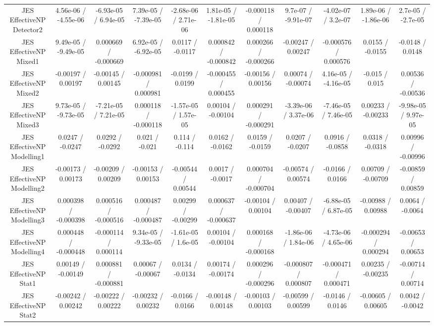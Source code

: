 \begin{table}[htbp]
\begin{center}
\begin{tabular}{|c|c|c|c|c|c|c|c|c|c|c|}
  JES EffectiveNP Detector2 & 4.56e-06 / -4.55e-06 & -6.93e-05 / 6.94e-05 & 7.39e-05 / -7.39e-05 & -2.68e-06 / 2.71e-06 & 1.81e-05 / -1.81e-05 & -0.000118 / 0.000118 & 9.7e-07 / -9.91e-07 & -4.02e-07 / 3.2e-07 & 1.89e-06 / -1.86e-06 & 2.7e-05 / -2.7e-05 \\ 
  JES EffectiveNP Mixed1 & 9.49e-05 / -9.49e-05 & 0.000669 / -0.000669 & 6.92e-05 / -6.92e-05 & 0.0117 / -0.0117 & 0.000842 / -0.000842 & 0.000266 / -0.000266 & -0.00247 / 0.00247 & -0.000576 / 0.000576 & 0.0155 / -0.0155 & -0.0148 / 0.0148 \\ 
  JES EffectiveNP Mixed2 & -0.00197 / 0.00197 & -0.00145 / 0.00145 & -0.000981 / 0.000981 & -0.0199 / 0.0199 & -0.000455 / 0.000455 & -0.00156 / 0.00156 & 0.00074 / -0.00074 & 4.16e-05 / -4.16e-05 & -0.015 / 0.015 & 0.00536 / -0.00536 \\ 
  JES EffectiveNP Mixed3 & 9.73e-05 / -9.73e-05 & -7.21e-05 / 7.21e-05 & 0.000118 / -0.000118 & -1.57e-05 / 1.57e-05 & 0.00104 / -0.00104 & 0.000291 / -0.000291 & -3.39e-06 / 3.37e-06 & -7.46e-05 / 7.46e-05 & 0.00233 / -0.00233 & -9.98e-05 / 9.97e-05 \\ 
  JES EffectiveNP Modelling1 & 0.0247 / -0.0247 & 0.0292 / -0.0292 & 0.021 / -0.021 & 0.114 / -0.114 & 0.0162 / -0.0162 & 0.0159 / -0.0159 & 0.0207 / -0.0207 & 0.0916 / -0.0858 & 0.0318 / -0.0318 & 0.00996 / -0.00996 \\ 
  JES EffectiveNP Modelling2 & -0.00173 / 0.00173 & -0.00209 / 0.00209 & -0.00153 / 0.00153 & -0.00544 / 0.00544 & 0.0017 / -0.0017 & 0.000704 / -0.000704 & -0.00574 / 0.00574 & -0.0166 / 0.0166 & 0.00709 / -0.00709 & -0.00859 / 0.00859 \\ 
  JES EffectiveNP Modelling3 & 0.000398 / -0.000398 & 0.000516 / -0.000516 & 0.000487 / -0.000487 & 0.00299 / -0.00299 & 0.000637 / -0.000637 & -0.00104 / 0.00104 & 0.00407 / -0.00407 & -6.88e-05 / 6.87e-05 & -0.00988 / 0.00988 & 0.0064 / -0.0064 \\ 
  JES EffectiveNP Modelling4 & 0.000448 / -0.000448 & -0.000114 / 0.000114 & 9.34e-05 / -9.33e-05 & -1.61e-05 / 1.6e-05 & 0.00104 / -0.00104 & 0.000168 / -0.000168 & -1.86e-06 / 1.84e-06 & -4.73e-06 / 4.65e-06 & -0.000294 / 0.000294 & -0.00653 / 0.00653 \\ 
  JES EffectiveNP Stat1 & 0.00149 / -0.00149 & 0.000881 / -0.000881 & 0.00067 / -0.00067 & 0.0134 / -0.0134 & 0.00174 / -0.00174 & 0.000296 / -0.000296 & -0.000807 / 0.000807 & -0.000471 / 0.000471 & 0.00235 / -0.00235 & -0.00714 / 0.00714 \\ 
  JES EffectiveNP Stat2 & -0.00242 / 0.00242 & -0.00222 / 0.00222 & -0.00232 / 0.00232 & -0.0166 / 0.0166 & -0.00148 / 0.00148 & -0.00103 / 0.00103 & -0.00599 / 0.00599 & -0.0146 / 0.0146 & -0.00605 / 0.00605 & 0.0042 / -0.0042 \\ 

\end{tabular}
\end{center}
\end{table}

